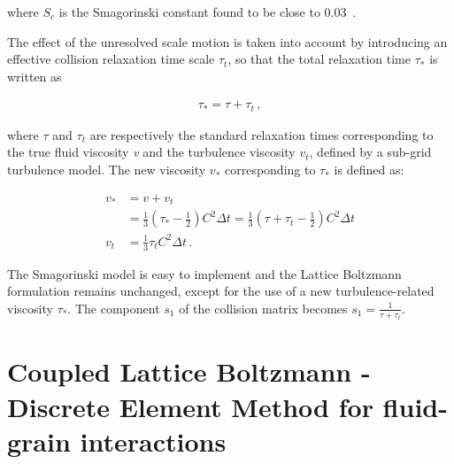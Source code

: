 \noindent where $\mathit{S}_{c}$ is the Smagorinski constant found to be close 
to 0.03~\citep{yu2005}. 

The effect of the unresolved scale motion is taken into account by introducing 
an effective collision relaxation time scale $\tau_{t}$, so that the total 
relaxation time $\tau_{*}$ is written as

\begin{align}
\tau_{*}=\tau + \tau_{t}\,,
\end{align} 

\noindent where $\tau$ and $\tau_{t}$ are respectively the standard relaxation 
times 
corresponding to the true fluid viscosity \textit{v} and the turbulence 
viscosity $\mathit{v}_{\mathit{t}}$, defined by a sub-grid turbulence model. 
The new viscosity $\mathit{v}_{*}$ corresponding to $\tau_{*}$ is defined as:

\begin{align}
\mathit{v}_{*} & 
=\mathit{v}+\mathit{v}_{\mathit{t}} \nonumber \\
	& =\frac{1}{3}(\tau_{*}-\frac{1}{2})
\mathit{C}^{2} \Delta \mathit{t} 
=\frac{1}{3}(\tau+\tau_{t}-\frac{1}{2})\mathit{C}^{2} \Delta \mathit{t}  \\
\mathit{v}_{\mathit{t}} & =\frac{1}{3}\tau_{\mathit{t}}\mathit{C}^{2} \Delta 
\textit{t} \,.
\end{align} 

The Smagorinski model is easy to implement and the Lattice Boltzmann 
formulation remains unchanged, except for the use of a new turbulence-related 
viscosity $\tau_{*}$. The component $s_1$ of the collision matrix becomes $s_1 
= \frac{1}{\tau+\tau_t}$.


\section[Coupled LB-DEM for fluid--grain interactions]{Coupled Lattice 
Boltzmann - Discrete Element Method for fluid-grain
interactions}

